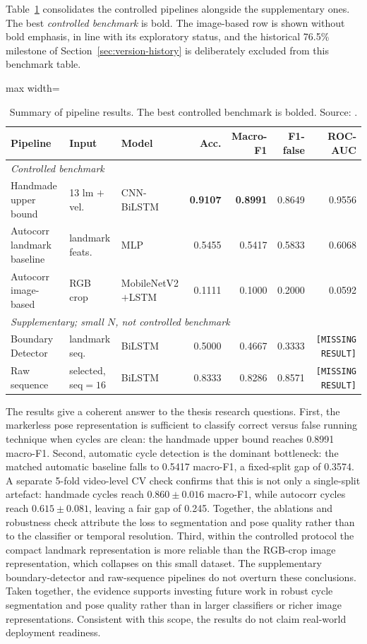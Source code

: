 Table~\ref{tab:summary} consolidates the controlled pipelines alongside the
supplementary ones. The best \emph{controlled benchmark} is bold. The
image-based row is shown without bold emphasis, in line with its exploratory
status, and the historical 76.5\% milestone of
Section~\ref{sec:version-history} is deliberately excluded from this benchmark
table.

\begin{table}[htbp]
\centering
\caption[Summary of pipeline results.]{Summary of pipeline results. The best controlled benchmark is bolded. Source: \protect{}.}
\label{tab:summary}
\tablefont
\begin{adjustbox}{max width=\textwidth}
\begin{tabular}{lllrrrr}
\toprule
Pipeline & Input & Model & Acc. & Macro-F1 & F1-false & ROC-AUC \\
\midrule
\multicolumn{7}{l}{\emph{Controlled benchmark}} \\
Handmade upper bound & 13 lm $+$ vel. & CNN-BiLSTM & \textbf{0.9107} & \textbf{0.8991} & 0.8649 & 0.9556 \\
Autocorr landmark baseline & landmark feats. & MLP & 0.5455 & 0.5417 & 0.5833 & 0.6068 \\
Autocorr image-based & RGB crop & MobileNetV2$+$LSTM & 0.1111 & 0.1000 & 0.2000 & 0.0592 \\
\midrule
\multicolumn{7}{l}{\emph{Supplementary; small $N$, not controlled benchmark}} \\
Boundary Detector & landmark seq. & BiLSTM & 0.5000 & 0.4667 & 0.3333 & \texttt{[MISSING RESULT]} \\
Raw sequence & selected, seq$=16$ & BiLSTM & 0.8333 & 0.8286 & 0.8571 & \texttt{[MISSING RESULT]} \\
\bottomrule
\end{tabular}
\end{adjustbox}
\end{table}

The results give a coherent answer to the thesis research questions. First,
the markerless pose representation is sufficient to classify correct versus
false running technique when cycles are clean: the handmade upper bound reaches
0.8991 macro-F1. Second, automatic cycle detection is the dominant bottleneck:
the matched automatic baseline falls to 0.5417 macro-F1, a fixed-split gap of
0.3574. A separate 5-fold video-level CV check confirms that this is not only a
single-split artefact: handmade cycles reach $0.860 \pm 0.016$ macro-F1, while
autocorr cycles reach $0.615 \pm 0.081$, leaving a fair gap of 0.245. Together,
the ablations and robustness check attribute the loss to segmentation and pose
quality rather than to the classifier or temporal resolution. Third, within the controlled protocol
the compact landmark representation is more reliable than the RGB-crop image
representation, which collapses on this small dataset. The supplementary
boundary-detector and raw-sequence pipelines do not overturn these conclusions.
Taken together, the evidence supports investing future work in robust cycle
segmentation and pose quality rather than in larger classifiers or richer image
representations. Consistent with this scope, the results do
not claim real-world deployment readiness.